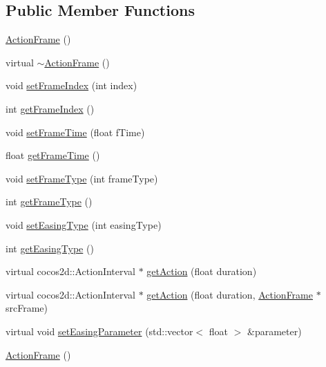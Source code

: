 \subsection*{Public Member Functions}
\begin{DoxyCompactItemize}
\item 
\hyperlink{classcocostudio_1_1ActionFrame_a830bed4204d29fc48d9564629c28e8e6}{Action\+Frame} ()
\item 
virtual \hyperlink{classcocostudio_1_1ActionFrame_a33cfe80667ec5c05b75d4cdc5e7b7b54}{$\sim$\+Action\+Frame} ()
\item 
void \hyperlink{classcocostudio_1_1ActionFrame_adbca76015f4ce16ecb2bb0bca49ef712}{set\+Frame\+Index} (int index)
\item 
int \hyperlink{classcocostudio_1_1ActionFrame_ac0a9d3c72983fed42f1a8822a0375499}{get\+Frame\+Index} ()
\item 
void \hyperlink{classcocostudio_1_1ActionFrame_a9a64130e3c776f083ee959b6e261b78e}{set\+Frame\+Time} (float f\+Time)
\item 
float \hyperlink{classcocostudio_1_1ActionFrame_aaf531864a6d4eecf2cffecc0999512c7}{get\+Frame\+Time} ()
\item 
void \hyperlink{classcocostudio_1_1ActionFrame_ad2086156bd154ae75dc32515fd150314}{set\+Frame\+Type} (int frame\+Type)
\item 
int \hyperlink{classcocostudio_1_1ActionFrame_a6dcd7610871fcbef3ed3806e56cd790a}{get\+Frame\+Type} ()
\item 
void \hyperlink{classcocostudio_1_1ActionFrame_ac853eabdb94f1f08deb52e09b8aece1d}{set\+Easing\+Type} (int easing\+Type)
\item 
int \hyperlink{classcocostudio_1_1ActionFrame_ac9cbd5d9b6751f4802b83a35941b680f}{get\+Easing\+Type} ()
\item 
virtual cocos2d\+::\+Action\+Interval $\ast$ \hyperlink{classcocostudio_1_1ActionFrame_a375216a44f6643d5e771299b1236dc51}{get\+Action} (float duration)
\item 
virtual cocos2d\+::\+Action\+Interval $\ast$ \hyperlink{classcocostudio_1_1ActionFrame_aad2a9c2314821270f5961416f4d7fb18}{get\+Action} (float duration, \hyperlink{classcocostudio_1_1ActionFrame}{Action\+Frame} $\ast$src\+Frame)
\item 
virtual void \hyperlink{classcocostudio_1_1ActionFrame_afb54df9da9e52bc85488ba6c51b40a28}{set\+Easing\+Parameter} (std\+::vector$<$ float $>$ \&parameter)
\item 
\hyperlink{classcocostudio_1_1ActionFrame_a830bed4204d29fc48d9564629c28e8e6}{Action\+Frame} ()

\end{DoxyCompactItemize}
